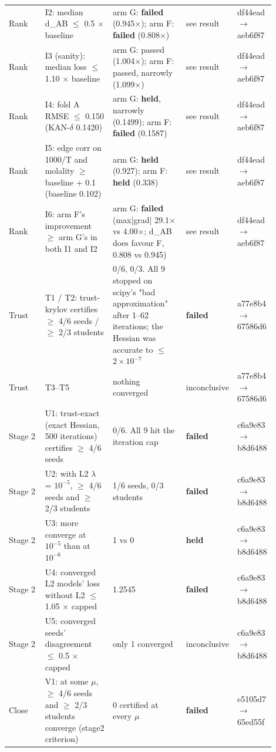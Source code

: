{\begin{longtable}{R{0.14\linewidth} R{0.26\linewidth} R{0.29\linewidth} R{0.10\linewidth} R{0.11\linewidth}}
Rank & I2: median d\_AB $\leq$ 0.5 $\times$ baseline & arm G: \textbf{failed} (0.945$\times$); arm F: \textbf{failed} (0.808$\times$) & see result & df44ead$\to$\allowbreak aeb6f87 \\
Rank & I3 (sanity): median loss $\leq$ 1.10 $\times$ baseline & arm G: passed (1.004$\times$); arm F: passed, narrowly (1.099$\times$) & see result & df44ead$\to$\allowbreak aeb6f87 \\
Rank & I4: fold A RMSE $\leq$ 0.150 (KAN-$\delta$ 0.1420) & arm G: \textbf{held}, narrowly (0.1499); arm F: \textbf{failed} (0.1587) & see result & df44ead$\to$\allowbreak aeb6f87 \\
Rank & I5: edge corr on 1000/T and molality $\geq$ baseline + 0.1 (baseline 0.102) & arm G: \textbf{held} (0.927); arm F: \textbf{held} (0.338) & see result & df44ead$\to$\allowbreak aeb6f87 \\
Rank & I6: arm F's improvement $\geq$ arm G's in both I1 and I2 & arm G: \textbf{failed} (max|grad| 29.1$\times$ vs 4.00$\times$; d\_AB does favour F, 0.808 vs 0.945) & see result & df44ead$\to$\allowbreak aeb6f87 \\
Trust & T1 / T2: trust-krylov certifies $\geq$ 4/6 seeds / $\geq$ 2/3 students & 0/6, 0/3. All 9 stopped on scipy's "bad approximation" after 1--62 iterations; the Hessian was accurate to $\leq$ $2\times10^{-7}$ & \textbf{failed} & a77e8b4$\to$\allowbreak 67586d6 \\
Trust & T3--T5 & nothing converged & inconclusive & a77e8b4$\to$\allowbreak 67586d6 \\
Stage 2 & U1: trust-exact (exact Hessian, 500 iterations) certifies $\geq$ 4/6 seeds & 0/6. All 9 hit the iteration cap & \textbf{failed} & c6a9e83$\to$\allowbreak b8d6488 \\
Stage 2 & U2: with L2 $\lambda$ = $10^{-5}$, $\geq$ 4/6 seeds and $\geq$ 2/3 students & 1/6 seeds, 0/3 students & \textbf{failed} & c6a9e83$\to$\allowbreak b8d6488 \\
Stage 2 & U3: more converge at $10^{-5}$ than at $10^{-6}$ & 1 vs 0 & \textbf{held} & c6a9e83$\to$\allowbreak b8d6488 \\
Stage 2 & U4: converged L2 models' loss without L2 $\leq$ 1.05 $\times$ capped & 1.2545 & \textbf{failed} & c6a9e83$\to$\allowbreak b8d6488 \\
Stage 2 & U5: converged seeds' disagreement $\leq$ 0.5 $\times$ capped & only 1 converged & inconclusive & c6a9e83$\to$\allowbreak b8d6488 \\
Close & V1: at some $\mu$, $\geq$ 4/6 seeds and $\geq$ 2/3 students converge (stage2 criterion) & 0 certified at every $\mu$ & \textbf{failed} & e5105d7$\to$\allowbreak{}65ed55f \\

\end{longtable}}
